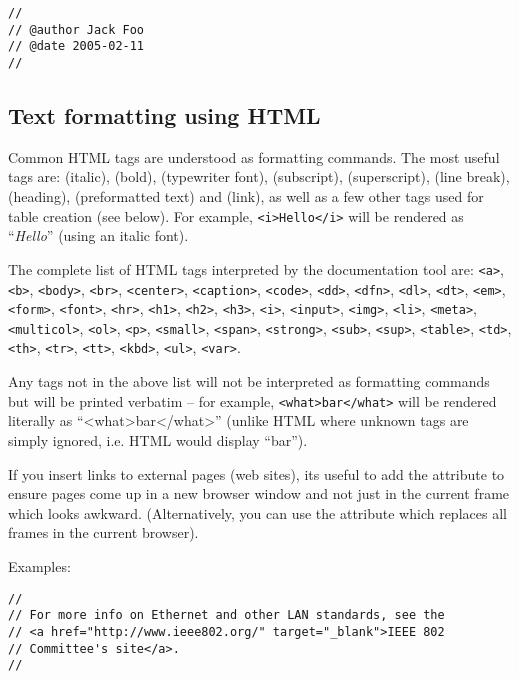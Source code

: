 \begin{verbatim}
//
// @author Jack Foo
// @date 2005-02-11
//
\end{verbatim}


\subsection{Text formatting using HTML}

Common HTML tags are understood as formatting commands.
The most useful tags are:  (italic),
 (bold),  (typewriter font),
 (subscript),  (superscript),
 (line break),  (heading),
 (preformatted text) and  (link),
as well as a few other tags used for table creation (see below).
For example, \texttt{<i>Hello</i>} will be rendered as ``\textit{Hello}''
(using an italic font).

The complete list of HTML tags interpreted by the documentation tool are:
\texttt{<a>}, \texttt{<b>}, \texttt{<body>}, \texttt{<br>}, \texttt{<center>},
\texttt{<caption>}, \texttt{<code>}, \texttt{<dd>}, \texttt{<dfn>}, \texttt{<dl>},
\texttt{<dt>}, \texttt{<em>}, \texttt{<form>}, \texttt{<font>}, \texttt{<hr>},
\texttt{<h1>}, \texttt{<h2>}, \texttt{<h3>}, \texttt{<i>}, \texttt{<input>}, \texttt{<img>},
\texttt{<li>}, \texttt{<meta>}, \texttt{<multicol>}, \texttt{<ol>}, \texttt{<p>}, \texttt{<small>},
\texttt{<span>}, \texttt{<strong>},
\texttt{<sub>}, \texttt{<sup>}, \texttt{<table>}, \texttt{<td>}, \texttt{<th>}, \texttt{<tr>},
\texttt{<tt>}, \texttt{<kbd>}, \texttt{<ul>}, \texttt{<var>}.

Any tags not in the above list will not be interpreted as formatting commands
but will be printed verbatim -- for example, \texttt{<what>bar</what>}
will be rendered literally as ``<what>bar</what>'' (unlike HTML where
unknown tags are simply ignored, i.e. HTML would display ``bar'').

If you insert links to external pages (web sites), its useful to add
the  attribute to ensure pages come up in a new
browser window and not just in the current frame which looks awkward.
(Alternatively, you can use the  attribute
which replaces all frames in the current browser).

Examples:

\begin{verbatim}
//
// For more info on Ethernet and other LAN standards, see the
// <a href="http://www.ieee802.org/" target="_blank">IEEE 802
// Committee's site</a>.
//
\end{verbatim}

